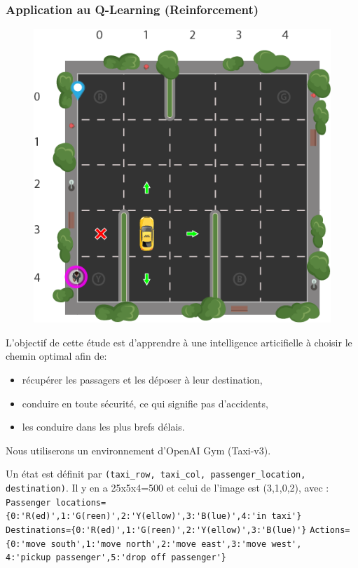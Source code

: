 \begin{frame}[fragile]
\frametitle{Application au Q-Learning (Reinforcement)}

\begin{figure}
\vspace{-0.5cm}
  \begin{center}
    \includegraphics[width=0.9\linewidth]{img/qlearning}
  \end{center}
\end{figure}

L'objectif de cette étude est d'apprendre à une intelligence articifielle à  choisir le chemin optimal afin de:
\begin{itemize}
 \item récupérer les passagers et les déposer à leur destination,
 \item conduire en toute sécurité, ce qui signifie pas d'accidents,
 \item les conduire dans les plus brefs délais.
\end{itemize}

Nous utiliserons un environnement d'OpenAI Gym (Taxi-v3).

Un état est définit par \verb?(taxi_row, taxi_col, passenger_location, destination)?. Il y en a 25x5x4=500 et celui de l'image est (3,1,0,2), avec :
\verb?Passenger locations={0:'R(ed)',1:'G(reen)',2:'Y(ellow)',3:'B(lue)',4:'in taxi'}?
\verb?Destinations={0:'R(ed)',1:'G(reen)',2:'Y(ellow)',3:'B(lue)'}?
\verb?Actions={0:'move south',1:'move north',2:'move east',3:'move west',?
\verb?            4:'pickup passenger',5:'drop off passenger'}?

\end{frame}

